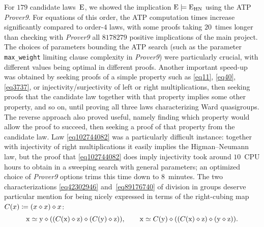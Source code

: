 For $179$ candidate laws~$\mathrm{E}$, we showed the implication $\mathrm{E}\models\mathrm{E}_{\mathrm{HN}}$ using the ATP \emph{Prover9}.  For equations of this order, the ATP computation times increase significantly compared to order-$4$ laws, with some proofs taking $20$~times longer than checking with \emph{Prover9} all $\num{8178279}$ positive implications of the main project.  The choices of parameters bounding the ATP search (such as the parameter \texttt{max\_weight} limiting clause complexity in \emph{Prover9}) were particularly crucial, with different values being optimal in different proofs.  Another important speed-up was obtained by seeking proofs of a simple property such as \eqref{eq11}, \eqref{eq40}, \eqref{eq3737}, or injectivity/surjectivity of left or right multiplications, then seeking proofs that the candidate law together with that property implies some other property, and so on, until proving all three laws characterizing Ward quasigroups.  The reverse approach also proved useful, namely finding which property would allow the proof to succeed, then seeking a proof of that property from the candidate law.  Law \eqref{eq102744082} was a particularly difficult instance: together with injectivity of right multiplications it easily implies the Higman--Neumann law, but the proof that \eqref{eq102744082} does imply injectivity took around $10$~CPU hours to obtain in a sweeping search with general parameters; an optimized choice of \emph{Prover9} options trims this time down to $8$~minutes.  The two characterizations \eqref{eq42302946} and~\eqref{eq89176740} of division in groups deserve particular mention for being nicely expressed in terms of the right-cubing map $C(x) \coloneqq (x \diamond x) \diamond x$:
\[
  \mathrm{x} \simeq \mathrm{y} \diamond ((C(\mathrm{x}) \diamond \mathrm{z}) \diamond (C(\mathrm{y}) \diamond \mathrm{z})) , \qquad
  \mathrm{x} \simeq C(\mathrm{y}) \diamond ((C(\mathrm{x}) \diamond \mathrm{z}) \diamond (\mathrm{y} \diamond \mathrm{z})) .
\]

